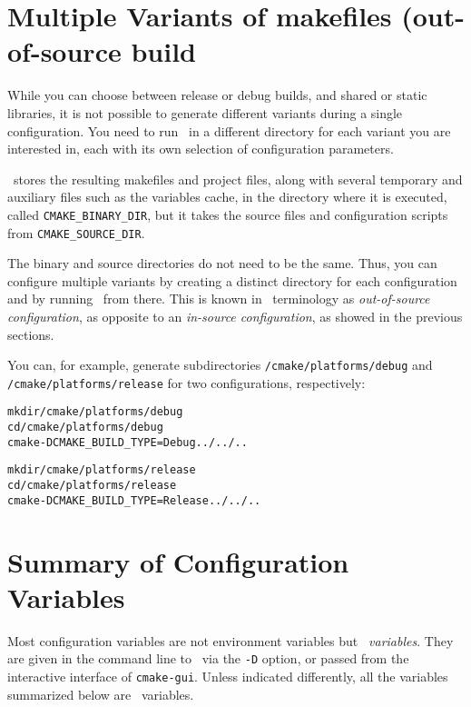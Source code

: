 \section{Multiple Variants of makefiles (out-of-source build}\label{sec:cmake-out-of-source}

While you can choose between release or debug builds, and shared or static libraries,
it is not possible to generate different variants during a single configuration. You need to run \cmake\ in a 
different directory for each variant you are interested in, each with its own selection of configuration parameters.

\cmake\ stores the resulting makefiles and project files, along with several temporary and auxiliary files such
as the variables cache, in the directory where it is executed, called \texttt{CMAKE\_BINARY\_DIR}, but it
takes the source files and configuration scripts from
\texttt{CMAKE\_SOURCE\_DIR}.

The binary and source directories do not need to be the same. Thus, you can configure multiple variants by creating a
distinct directory for each configuration and by running \cmake\ from there. This is known in \cmake\ terminology
as  \emph{out-of-source configuration}, as opposite to an \emph{in-source
  configuration}, as showed in the previous sections.

You can, for example, generate subdirectories \cgalrel{}\texttt{/cmake/platforms/debug} and 
\cgalrel{}\texttt{/cmake/platforms/release} for two configurations, respectively:

{\ccTexHtml{}{}
\begin{alltt}
mkdir \cgalrel/cmake/platforms/debug
cd \cgalrel/cmake/platforms/debug
cmake -DCMAKE_BUILD_TYPE=Debug ../../..

mkdir \cgalrel/cmake/platforms/release
cd \cgalrel/cmake/platforms/release
cmake -DCMAKE_BUILD_TYPE=Release ../../..
\end{alltt}
}

\section{Summary of Configuration Variables}

Most configuration variables are not environment variables but \emph{\cmake\ variables}. They are given in the command line to \cmake\ via the \texttt{-D} option, 
or passed from the interactive interface of \texttt{cmake-gui}. Unless
indicated differently, all the variables summarized below are \cmake\ variables.

